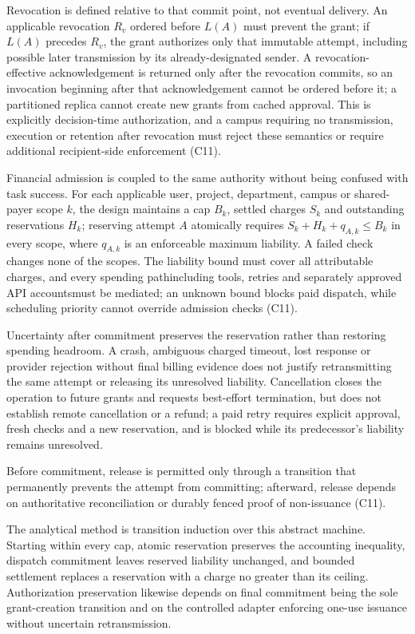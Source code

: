 \documentclass[11pt]{article}
\begin{document}
Revocation is defined relative to that commit point, not eventual delivery. An applicable revocation $R_v$ ordered before $L(A)$ must prevent the grant; if $L(A)$ precedes $R_v$, the grant authorizes only that immutable attempt, including possible later transmission by its already-designated sender. A revocation-effective acknowledgement is returned only after the revocation commits, so an invocation beginning after that acknowledgement cannot be ordered before it; a partitioned replica cannot create new grants from cached approval. This is explicitly decision-time authorization, and a campus requiring no transmission, execution or retention after revocation must reject these semantics or require additional recipient-side enforcement (C11).

Financial admission is coupled to the same authority without being confused with task success. For each applicable user, project, department, campus or shared-payer scope $k$, the design maintains a cap $B_k$, settled charges $S_k$ and outstanding reservations $H_k$; reserving attempt $A$ atomically requires $S_k+H_k+q_{A,k}\leq B_k$ in every scope, where $q_{A,k}$ is an enforceable maximum liability. A failed check changes none of the scopes. The liability bound must cover all attributable charges, and every spending path\textemdash{}including tools, retries and separately approved API accounts\textemdash{}must be mediated; an unknown bound blocks paid dispatch, while scheduling priority cannot override admission checks (C11).

Uncertainty after commitment preserves the reservation rather than restoring spending headroom. A crash, ambiguous charged timeout, lost response or provider rejection without final billing evidence does not justify retransmitting the same attempt or releasing its unresolved liability. Cancellation closes the operation to future grants and requests best-effort termination, but does not establish remote cancellation or a refund; a paid retry requires explicit approval, fresh checks and a new reservation, and is blocked while its predecessor's liability remains unresolved.

Before commitment, release is permitted only through a transition that permanently prevents the attempt from committing; afterward, release depends on authoritative reconciliation or durably fenced proof of non-issuance (C11).

The analytical method is transition induction over this abstract machine. Starting within every cap, atomic reservation preserves the accounting inequality, dispatch commitment leaves reserved liability unchanged, and bounded settlement replaces a reservation with a charge no greater than its ceiling. Authorization preservation likewise depends on final commitment being the sole grant-creation transition and on the controlled adapter enforcing one-use issuance without uncertain retransmission.
\end{document}
